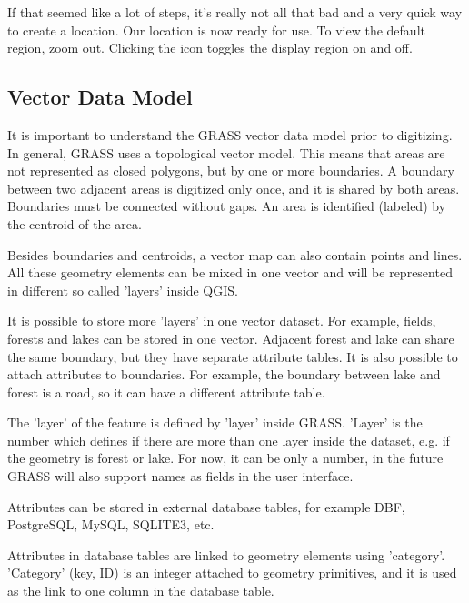 If that seemed like a lot of steps, it's really not all that bad and a very 
quick way to create a location. Our location is now ready for use. To view 
the default region, zoom out. Clicking the  icon toggles the display region on and off. 

\subsection{Vector Data Model}\label{label_vectmodel}

It is important to understand the GRASS vector data model prior to
digitizing. In general, GRASS uses a topological
vector model. This means that areas are not represented
as closed polygons, but by one or more boundaries. A boundary between two
adjacent areas is digitized only once, and it is shared by both areas.
Boundaries must be connected without gaps. An area is identified (labeled) by
the centroid of the area.

Besides boundaries and centroids, a vector map can also contain
points and lines. All these geometry elements can be mixed
in one vector and will be represented in different so called 'layers' inside
QGIS.

It is possible to store more 'layers' in one vector dataset. For example,
fields, forests and lakes can be stored in one vector. Adjacent
forest and lake can share the same boundary, but they have separate attribute
tables. It is also possible to attach attributes to boundaries. For example,
the boundary between lake and forest is a road, so it can have a different 
attribute table.
 
The 'layer' of the feature is defined by 'layer' inside GRASS.
'Layer' is the number which defines if there are more than one layer inside the 
dataset, e.g. if the geometry is forest or lake.
For now, it can be only a number, in the future GRASS will also support  
names as fields in the user interface.

Attributes can be stored in external database tables, for example
DBF, PostgreSQL, MySQL, SQLITE3, etc.

Attributes in database tables are linked to geometry elements using
'category'. 'Category' (key, ID) is an
integer attached to geometry primitives, and it is used as the link to one
column in the database table.


